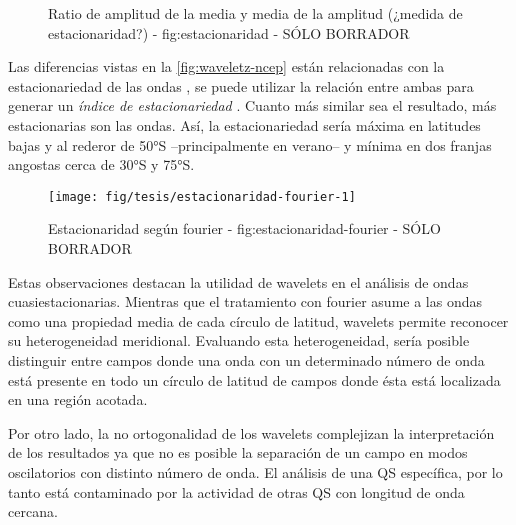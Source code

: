 \documentclass[spanish,a4paper]{book}
\begin{document}
\begin{figure}
\newline{}\caption{Ratio de amplitud de la media y media de la amplitud (¿medida de estacionaridad?) - fig:estacionaridad - SÓLO BORRADOR}\label{fig:estacionaridad}
\end{figure}

Las diferencias vistas en la \autoref{fig:waveletz-ncep} están
relacionadas con la estacionariedad de las ondas
,
se puede utilizar la relación entre ambas para generar un \emph{índice
de estacionariedad} . Cuanto más
similar sea el resultado, más estacionarias son las ondas. Así, la
estacionariedad sería máxima en latitudes bajas y al rederor de 50°S
--principalmente en verano-- y mínima en dos franjas angostas cerca de
30°S y 75°S. 

\begin{figure}
\texttt{[image: fig/tesis/estacionaridad-fourier-1]} \caption{Estacionaridad según fourier - fig:estacionaridad-fourier - SÓLO BORRADOR}\label{fig:estacionaridad-fourier}
\end{figure}

Estas observaciones destacan la utilidad de wavelets en el análisis de
ondas cuasiestacionarias. Mientras que el tratamiento con fourier asume
a las ondas como una propiedad media de cada círculo de latitud,
wavelets permite reconocer su heterogeneidad meridional. Evaluando esta
heterogeneidad, sería posible distinguir entre campos donde una onda con
un determinado número de onda está presente en todo un círculo de
latitud de campos donde ésta está localizada en una región acotada.

Por otro lado, la no ortogonalidad de los wavelets complejizan la
interpretación de los resultados ya que no es posible la separación de
un campo en modos oscilatorios con distinto número de onda. El análisis
de una QS específica, por lo tanto está contaminado por la actividad de
otras QS con longitud de onda cercana.
\end{document}

